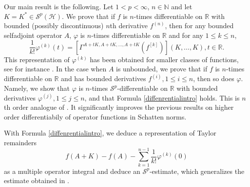 \documentclass[12pt]{amsart}
\theoremstyle{remark}
\begin{document}
Our main result is the following. Let $1<p<\infty$, $n\in \mathbb{N}$ and let $K=K^* \in \mathcal{S}^p(\mathcal{H})$. We prove that if $f$ is $n$-times differentiable on $\mathbb{R}$ with bounded (possibly discontinuous) $n$th derivative $f^{(n)}$, then for any bounded selfadjoint operator $A$, $\varphi$ is $n$-times differentiable on $\mathbb{R}$ and for any $1\leq k\leq n$, 
\begin{equation}\label{diffenrentialintro}
\dfrac{1}{k!} \varphi^{(k)}(t) = \left[ \Gamma^{A+tK, A+tK, \ldots, A+tK}(f^{[k]}) \right] (K, \ldots, K), t\in \mathbb{R}.
\end{equation}
This representation of $\varphi^{(k)}$ has been obtained for smaller classes of functions, see for instance \cite{ACDS,CLSS,Peller2006,Stek}.
In the case when $A$ is unbounded, we prove that if $f$ is $n$-times differentiable on $\mathbb{R}$ and has bounded derivatives $f^{(i)}, 1\leq i\leq n$, then so does $\varphi$. Namely, we show that $\varphi$ is $n$-times $\mathcal{S}^p$-differentiable on $\mathbb{R}$ with bounded derivatives $\varphi^{(j)}, 1 \leq j \leq n$, and that Formula \eqref{diffenrentialintro} holds. This is $n$th order analogue of \cite[Theorem 7.13]{KPSS}. It significantly improves the previous results on higher order differentiabily of operator functions in Schatten norms.

With Formula \eqref{diffenrentialintro}, we deduce a representation of Taylor remainders
$$
f(A+K)-f(A) - \sum_{k=1}^{n-1} \frac{1}{k!}\varphi^{(k)}(0)
$$
as a multiple operator integral and deduce an $\mathcal{S}^p$-estimate, which generalizes the estimate obtained in \cite{LMS}.
\end{document}
